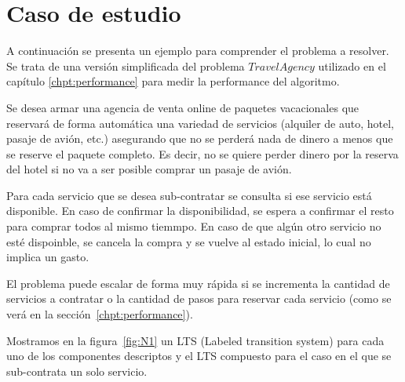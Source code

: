 
\section{Caso de estudio}\label{chpt:casoAviones}
A continuación se presenta un ejemplo para comprender el problema a resolver. Se trata de una versión simplificada del problema $Travel Agency$ utilizado en el capítulo \ref{chpt:performance} para medir la performance del algoritmo.

Se desea armar una agencia de venta online de paquetes vacacionales que reservará de forma automática una variedad de servicios (alquiler de auto, hotel, pasaje de avión, etc.) asegurando que no se perderá nada de dinero a menos que se reserve el paquete completo. Es decir, no se quiere perder dinero por la reserva del hotel si no va a ser posible comprar un pasaje de avión.

Para cada servicio que se desea sub-contratar se consulta si ese servicio está disponible. En caso de confirmar la disponibilidad, se espera a confirmar el resto para comprar todos al  mismo tiemmpo. En caso de que algún otro servicio no esté dispoinble, se cancela la compra y se vuelve al estado inicial, lo cual no implica un gasto.

El problema puede escalar de forma muy rápida si se incrementa la cantidad de servicios a contratar o la cantidad de pasos para reservar cada servicio (como se verá en la sección~\ref{chpt:performance}).

Mostramos en la figura~\ref{fig:N1} un LTS (Labeled transition system) para cada uno de los componentes descriptos y el LTS compuesto para el caso en el que se sub-contrata un solo servicio.


